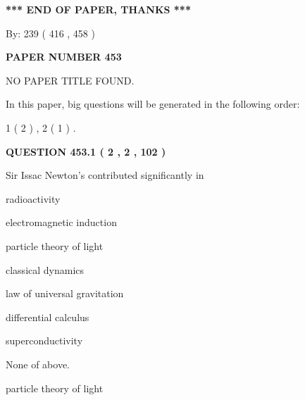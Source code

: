 \documentclass[12pt]{article}
\begin{document}
   
\vspace{1.0in} 
{\textbf{\large{ *** END OF PAPER, THANKS *** }}} 
   
   
\hspace{1.0in} By: 
 239 ( 416 ,  458 )
   
   
   
   
\newpage 
\setcounter{page}{ 
   453001 } 
   
   
   
   
 {\textbf{ \Large{ PAPER NUMBER  453  }}}
   
   
\vspace{0.2in}
   
   
   
   
   
   
 NO PAPER TITLE FOUND.
   
   
   
\vspace{0.2in}
   
In this paper, big questions will be generated in the following order: 
   
   
   1 ( 2 )
 ,
   2 ( 1 )
 .
  
\vspace{0.2in}
  
{\textbf{\Large{QUESTION
453.1 
 ( 2 , 2 , 102 )
}}}
  
  
Sir Issac Newton's contributed significantly in
 
 
radioactivity
 
 
electromagnetic induction
 
 
particle theory of light
 
 
classical dynamics
 
 
law of universal gravitation
 
 
differential calculus
 
 
superconductivity
 
 
 None of above.
 
 
\noindent{}
 
 
particle theory of light
 
\end{document}
